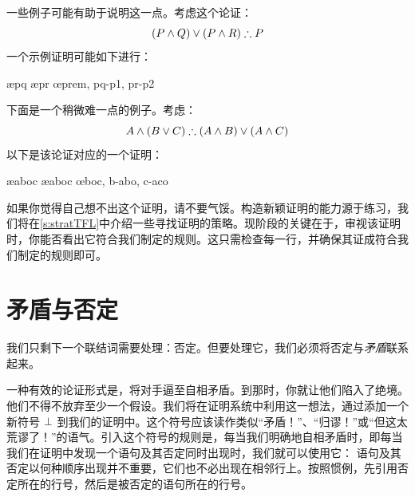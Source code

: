 一些例子可能有助于说明这一点。考虑这个论证：
$$(P \eand Q) \eor (P \eand R) \therefore P$$
一个示例证明可能如下进行：


\begin{fitchproof}
		\PR
			\open
				\AS
				\ae{pq}
			\close
			\open
				\AS
				\ae{pr}
			\close
		\oe{prem, pq-p1, pr-p2}
	\end{fitchproof}


下面是一个稍微难一点的例子。考虑：
	$$ A \eand (B \eor C) \therefore (A \eand B) \eor (A \eand C)$$
以下是该论证对应的一个证明：


\begin{fitchproof}
		\PR
		\ae{aboc}
		\ae{aboc}
		\open
			\AS
		\close
		\open
			\AS
		\close
	\oe{boc, b-abo, c-aco}
	\end{fitchproof}


如果你觉得自己想不出这个证明，请不要气馁。构造新颖证明的能力源于练习，我们将在\cref{s:stratTFL}中介绍一些寻找证明的策略。现阶段的关键在于，审视该证明时，你能否看出它符合我们制定的规则。这只需检查每一行，并确保其证成符合我们制定的规则即可。

\section{矛盾与否定}\label{sec:contradiction}

我们只剩下一个联结词需要处理：否定。但要处理它，我们必须将否定与\emph{矛盾}联系起来。

一种有效的论证形式是，将对手逼至自相矛盾。到那时，你就让他们陷入了绝境。他们不得不放弃至少一个假设。我们将在证明系统中利用这一想法，通过添加一个新符号 $\bot$ 到我们的证明中。这个符号应该读作类似“矛盾！”、“归谬！”或“但这太荒谬了！”的语气。引入这个符号的规则是，每当我们明确地自相矛盾时，即每当我们在证明中发现一个语句及其否定同时出现时，我们就可以使用它：
语句及其否定以何种顺序出现并不重要，它们也不必出现在相邻行上。按照惯例，先引用否定所在的行号，然后是被否定的语句所在的行号。

